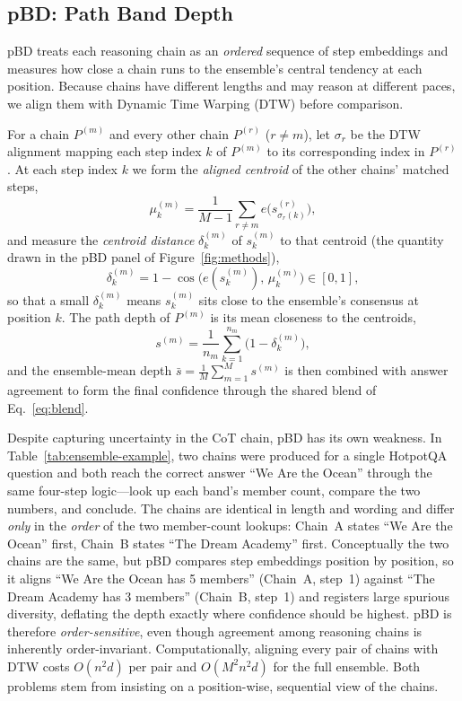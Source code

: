 \documentclass[11pt]{article}
\begin{document}
\subsection{pBD: Path Band Depth}
\label{sec:method:pbd}

pBD treats each reasoning chain as an \emph{ordered} sequence of step embeddings
and measures how close a chain runs to the ensemble's central tendency at each
position. Because chains have different lengths and may reason at different
paces, we align them with Dynamic Time Warping (DTW) before comparison.

For a chain $P^{(m)}$ and every other chain $P^{(r)}$ ($r \neq m$), let
$\sigma_r$ be the DTW alignment mapping each step index $k$ of $P^{(m)}$ to its
corresponding index in $P^{(r)}$. At each step index $k$ we form the
\emph{aligned centroid} of the other chains' matched steps,
\begin{equation}
  \mu_k^{(m)} = \frac{1}{M-1} \sum_{r \neq m} e\big(s_{\sigma_r(k)}^{(r)}\big),
\end{equation}
and measure the \emph{centroid distance} $\delta_k^{(m)}$ of $s_k^{(m)}$ to that
centroid (the quantity drawn in the pBD panel of Figure~\ref{fig:methods}),
\begin{equation}
  \delta_k^{(m)} = 1 - \cos\!\big( e(s_k^{(m)}),\, \mu_k^{(m)} \big) \in [0, 1],
\end{equation}
so that a small $\delta_k^{(m)}$ means $s_k^{(m)}$ sits close to the ensemble's
consensus at position $k$. The path depth of $P^{(m)}$ is its mean closeness to
the centroids,
\begin{equation}
  s^{(m)} = \frac{1}{n_m} \sum_{k=1}^{n_m} \big( 1 - \delta_k^{(m)} \big),
\end{equation}
and the ensemble-mean depth $\bar{s} = \frac{1}{M} \sum_{m=1}^{M} s^{(m)}$ is
then combined with answer agreement to form the final confidence through the
shared blend of Eq.~\eqref{eq:blend}.

Despite capturing uncertainty in the CoT chain, pBD has its own weakness. In
Table~\ref{tab:ensemble-example}, two chains were produced for a single HotpotQA
question and both reach the correct answer ``We Are the Ocean'' through the same
four-step logic---look up each band's member count, compare the two numbers, and
conclude. The chains are identical in length and wording and differ \emph{only}
in the \emph{order} of the two member-count lookups: Chain~A states ``We Are the
Ocean'' first, Chain~B states ``The Dream Academy'' first. Conceptually the two
chains are the same, but pBD compares step embeddings position by position, so it
aligns ``We Are the Ocean has 5 members'' (Chain~A, step~1) against ``The Dream
Academy has 3 members'' (Chain~B, step~1) and registers large spurious diversity,
deflating the depth exactly where confidence should be highest. pBD is therefore
\emph{order-sensitive}, even though agreement among reasoning chains is inherently
order-invariant. Computationally, aligning every pair of chains with DTW costs
$O(n^2 d)$ per pair and $O(M^2 n^2 d)$ for the full ensemble. Both problems stem
from insisting on a position-wise, sequential view of the chains.
\end{document}
